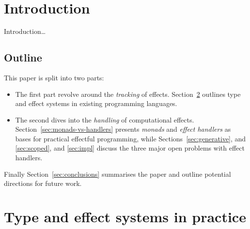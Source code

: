 \documentclass[preprint,9pt,numbers]{sigplanconf}
\title{\thetitle{}}
\begin{document}
\makeatletter
\def\@copyrightspace{\relax}
\makeatother

\preprintfooter{} %

\setlength{\pdfpageheight}{\paperheight}
\setlength{\pdfpagewidth}{\paperwidth}

\maketitle

\begin{abstract}
  Many programs are by nature effectful: they interact with one
  another, manage their own internal state, cause and handle faults,
  and so forth. 
\end{abstract}

\section{Introduction}
Introduction\dots

\subsection{Outline}
This paper is split into two parts:
\begin{itemize}
\item The first part revolve around the \emph{tracking} of
  effects. Section~\ref{sec:effpractice} outlines type and effect
  systems in existing programming languages.
\item The second dives into the \emph{handling} of computational
  effects. Section~\ref{sec:monads-vs-handlers} presents \emph{monads}
  and \emph{effect handlers} as bases for practical effectful
  programming, while Sections~\ref{sec:generative}, and
  \ref{sec:scoped}, and \ref{sec:impl} discuss the three major open
  problems with effect handlers.
\end{itemize}
Finally Section~\ref{sec:conclusions} summarises the paper and outline
potential directions for future work.


\section{Type and effect systems in practice}
\label{sec:effpractice}
\end{document}
